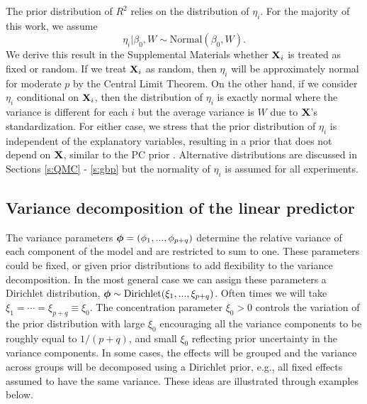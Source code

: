 \documentclass[12pt]{article}
\begin{document}
The prior distribution of $R^2$ relies on the distribution of $\eta_i$. For the majority of this work, we assume
\begin{equation}\label{eq:eta_dist}
    \eta_i|\beta_0,W \sim \mbox{Normal}(\beta_0, W).
\end{equation}
We derive this result in the Supplemental Materials whether $\mbox{\bf X}_i$ is treated as fixed or random. If we treat $\mbox{\bf X}_i$ as random, then $\eta_i$ will be approximately normal for moderate $p$ by the Central Limit Theorem. On the other hand, if we consider $\eta_i$ conditional on $\mbox{\bf X}_i$, then the distribution of $\eta_i$ is exactly normal where the variance is different for each $i$ but the average variance is $W$ due to $\mbox{\bf X}$'s standardization. For either case, we stress that the prior distribution of $\eta_i$ is independent of the explanatory variables, resulting in a prior that does not depend on $\mbox{\bf X}$, similar to the PC prior \citep{simpson2017penalising}. Alternative distributions are discussed in Sections \ref{s:QMC} - \ref{s:gbp} but the normality of $\eta_i$ is assumed for all experiments.




\subsection{Variance decomposition of the linear predictor}

The variance parameters $\mbox{\boldmath $\phi$} = (\phi_1,...,\phi_{p+q})$ determine the relative variance of each component of the model and are restricted to sum to one.  These parameters could be fixed, or given prior distributions to add flexibility to the variance decomposition.   In the most general case we can assign these parameters a Dirichlet distribution, $\mbox{\boldmath $\phi$}\sim\mbox{Dirichlet}(\xi_1,...,\xi_{p+q})$. Often times we will take $\xi_1=\cdots=\xi_{p+q}\equiv \xi_0$.  The concentration parameter $\xi_0>0$ controls the variation of the prior distribution with large $\xi_0$ encouraging all the variance components to be roughly equal to $1/(p+q)$, and small $\xi_0$ reflecting prior uncertainty in the variance components.  In some cases, the effects will be grouped and the variance across groups will be decomposed using a Dirichlet prior, e.g., all fixed effects assumed to have the same variance.  These ideas are illustrated through examples below.
\end{document}
